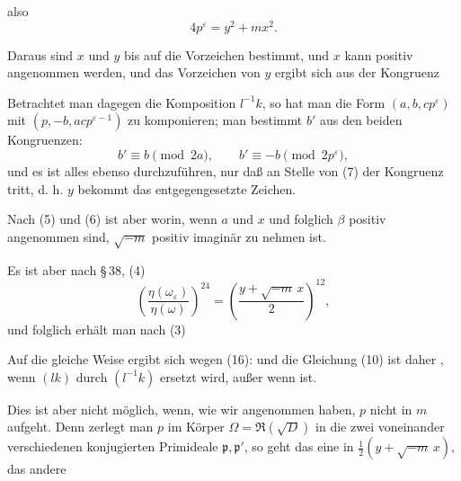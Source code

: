 also
\[ 4 p^\varepsilon = y^2 + m x^2. \]

Daraus sind $x$ und $y$ bis auf die Vorzeichen bestimmt, und $x$ kann positiv angenommen werden, und das Vorzeichen von $y$ ergibt sich aus der Kongruenz

Betrachtet man dagegen die Komposition $l^{-1} k$, so hat man die Form $(a, b, c p^\varepsilon)$ mit $(p, -b, a c p^{\varepsilon - 1})$ zu komponieren; man bestimmt $b'$ aus den beiden Kongruenzen:
\[ b' \equiv b \pmod{2a}, \qquad b' \equiv -b \pmod{2 p^\varepsilon}, \]
und es ist alles ebenso durchzuführen, nur daß an Stelle von (7) der Kongruenz %
tritt, d. h. $y$ bekommt das entgegengesetzte Zeichen.

Nach (5) und (6) ist aber
worin, wenn $a$ und $x$ und folglich $\beta$ positiv angenommen sind, $\sqrt{-m}$ positiv imaginär zu nehmen ist.

Es ist aber nach \S\,38, (4)
\[ \left( \frac{\eta(\omega_\varepsilon)}{\eta(\omega)} \right)^{24} = \left( \frac{y + \sqrt{-m}\, x}{2} \right)^{12}, \]
und folglich erhält man nach (3)

Auf die gleiche Weise ergibt sich wegen (16): %
und die Gleichung (10) ist daher , wenn $(lk)$ durch $(l^{-1}k)$ ersetzt wird, außer wenn
ist.

Dies ist aber nicht möglich, wenn, wie wir angenommen haben, $p$ nicht in $m$ aufgeht. Denn zerlegt man $p$ im Körper $\Omega = \Re(\sqrt{D})$ in die zwei voneinander verschiedenen konjugierten Primideale $\mathfrak{p}, \mathfrak{p}'$, so geht das eine in $\frac{1}{2}(y + \sqrt{-m}\, x)$, das andere
